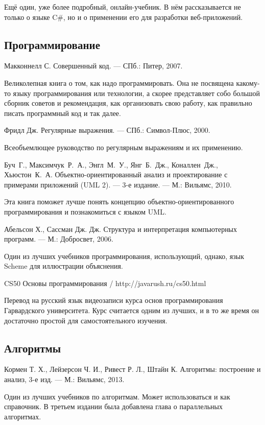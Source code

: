 \begin{thebibliography}{99}
  Ещё один, уже более подробный, онлайн-учебник. В нём рассказывается
  не только о языке C\#, но и о применении его для разработки
  веб-приложений.

  \subsection*{Программирование}

  Макконнелл С. Совершенный код. — СПб.: Питер, 2007.

  Великолепная книга о том, как надо программировать. Она не посвящена
  какому-то языку программирования или технологии, а скорее
  представляет собо большой сборник советов и рекомендация, как
  организовать свою работу, как правильно писать программный код и так
  далее.

  Фридл Дж. Регулярные выражения. — СПб.: Символ-Плюс, 2000.

  Всеобъемлющее руководство по регулярным выражениям и их применению.

  Буч~Г., Максимчук~Р.~А., Энгл~М.~У., Янг~Б.~Дж., Коналлен~Дж., Хьюстон~К.~А. Объектно-ориентированный анализ и проектирование с примерами приложений (UML 2). — 3-е издание. — М.: Вильямс, 2010.

  Эта книга поможет лучше понять концепцию объектно-ориентированного
  программирования и познакомиться с языком UML.

  Абельсон Х., Сассман Дж. Дж. Структура и интерпретация компьютерных программ. — М.: Добросвет, 2006.

  Один из лучших учебников программирования, использующий, однако,
  язык Scheme для иллюстрации объяснения.

  CS50 Основы программирования / http://javarush.ru/cs50.html

  Перевод на русский язык видеозаписи курса основ программирования
  Гарвардского университета.  Курс считается одним из лучших, и в то
  же время он достаточно простой для самостоятельного изучения.

  \subsection*{Алгоритмы}
  
  Кормен Т. Х., Лейзерсон Ч. И., Ривест Р. Л., Штайн К. Алгоритмы: построение и анализ, 3-е изд. — М.: Вильямс, 2013.
  
  Один из лучших учебников по алгоритмам. Может использоваться и как
  справочник. В третьем издании была добавлена глава о параллельных
  алгоритмах.
  

\end{thebibliography}
